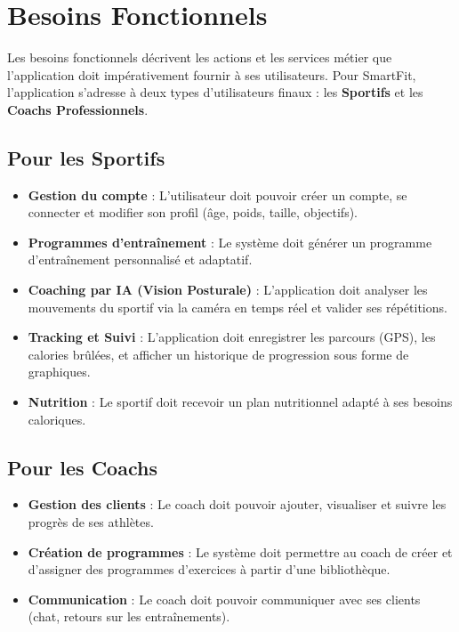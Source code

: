 \section{Besoins Fonctionnels}
Les besoins fonctionnels décrivent les actions et les services métier que l'application doit impérativement fournir à ses utilisateurs. Pour SmartFit, l'application s'adresse à deux types d'utilisateurs finaux : les \textbf{Sportifs} et les \textbf{Coachs Professionnels}.

\subsection{Pour les Sportifs}
\begin{itemize}
    \item \textbf{Gestion du compte} : L'utilisateur doit pouvoir créer un compte, se connecter et modifier son profil (âge, poids, taille, objectifs).
    \item \textbf{Programmes d'entraînement} : Le système doit générer un programme d'entraînement personnalisé et adaptatif.
    \item \textbf{Coaching par IA (Vision Posturale)} : L'application doit analyser les mouvements du sportif via la caméra en temps réel et valider ses répétitions.
    \item \textbf{Tracking et Suivi} : L'application doit enregistrer les parcours (GPS), les calories brûlées, et afficher un historique de progression sous forme de graphiques.
    \item \textbf{Nutrition} : Le sportif doit recevoir un plan nutritionnel adapté à ses besoins caloriques.
\end{itemize}

\subsection{Pour les Coachs}
\begin{itemize}
    \item \textbf{Gestion des clients} : Le coach doit pouvoir ajouter, visualiser et suivre les progrès de ses athlètes.
    \item \textbf{Création de programmes} : Le système doit permettre au coach de créer et d'assigner des programmes d'exercices à partir d'une bibliothèque.
    \item \textbf{Communication} : Le coach doit pouvoir communiquer avec ses clients (chat, retours sur les entraînements).
\end{itemize}
